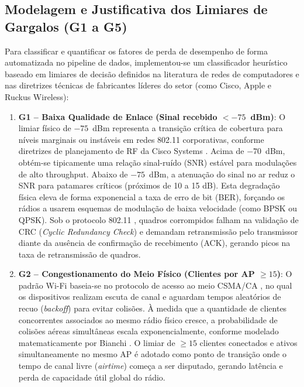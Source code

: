 \subsection{Modelagem e Justificativa dos Limiares de Gargalos (G1 a G5)}
\label{subsec:metodologia_gargalos_justificativa}

Para classificar e quantificar os fatores de perda de desempenho de forma automatizada no pipeline de dados, implementou-se um classificador heurístico baseado em limiares de decisão definidos na literatura de redes de computadores e nas diretrizes técnicas de fabricantes líderes do setor (como Cisco, Apple e Ruckus Wireless):

\begin{enumerate}
    \item \textbf{G1 – Baixa Qualidade de Enlace (Sinal recebido $< -75$~dBm)}: O limiar físico de $-75$~dBm representa a transição crítica de cobertura para níveis marginais ou instáveis em redes 802.11 corporativas, conforme diretrizes de planejamento de RF da Cisco Systems \cite{cisco2020design}. Acima de $-70$~dBm, obtém-se tipicamente uma relação sinal-ruído (SNR) estável para modulações de alto throughput. Abaixo de $-75$~dBm, a atenuação do sinal no ar reduz o SNR para patamares críticos (próximos de 10 a 15 dB). Esta degradação física eleva de forma exponencial a taxa de erro de bit (BER), forçando os rádios a usarem esquemas de modulação de baixa velocidade (como BPSK ou QPSK). Sob o protocolo 802.11 \cite{gast2005}, quadros corrompidos falham na validação de CRC (\textit{Cyclic Redundancy Check}) e demandam retransmissão pelo transmissor diante da ausência de confirmação de recebimento (ACK), gerando picos na taxa de retransmissão de quadros.
    
    \item \textbf{G2 – Congestionamento do Meio Físico (Clientes por AP $\ge 15$)}: O padrão Wi-Fi baseia-se no protocolo de acesso ao meio CSMA/CA \cite{gast2005}, no qual os dispositivos realizam escuta de canal e aguardam tempos aleatórios de recuo (\textit{backoff}) para evitar colisões. À medida que a quantidade de clientes concorrentes associados ao mesmo rádio físico cresce, a probabilidade de colisões aéreas simultâneas escala exponencialmente, conforme modelado matematicamente por Bianchi \cite{bianchi2000}. O limiar de $\ge 15$ clientes conectados e ativos simultaneamente no mesmo AP é adotado como ponto de transição onde o tempo de canal livre (\textit{airtime}) começa a ser disputado, gerando latência e perda de capacidade útil global do rádio.
    

\end{enumerate}
